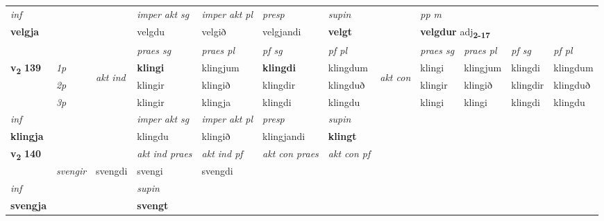 \begin{longtable}[l]{X>{\footnotesize\itshape}llXXXXlXXXX}
\cmidrule{4-7}
   {\textit{inf}} & &  & \textit{imper akt sg} & \textit{imper akt pl}   & \textit{presp} & \textit{supin}  && \textit{pp m} \\*
  {\textbf{velgja}} & && velgdu  & velgið   & velgjandi &  \textbf{velgt}  && \multicolumn{2}{l}{\textbf{velgdur} adj\textbf{\textsubscript{2-17}}} \\*

\midrule

 & &   & \textit{praes sg}  & \textit{praes pl}    & \textit{ pf sg} & \textit{pf pl} & & \textit{praes sg}  & \textit{praes pl}    & \textit{pf sg} & \textit{pf pl }  \\ \cmidrule{4-7} \cmidrule{9-12}
 \multirow{2}{*}{{{\textbf{v{\textsubscript{2}}} \Large{\textbf{139}}}}}  & 1p & \multirow{3}{*}{\begin{turn}{90}\textit{akt ind}\end{turn}} & \textbf{klingi} & klingjum & \textbf{klingdi} & klingdum & \multirow{3}{*}{\begin{turn}{90}\textit{akt con}\end{turn}} &klingi & klingjum & klingdi & klingdum\\*
 & 2p &  &  klingir  & klingið & klingdir & klingduð & & klingir & klingið & klingdir & klingduð \\*
 & 3p &  & klingir & klingja & klingdi & klingdu & & klingi & klingi& klingdi & klingdu \\*
\cmidrule{4-7} \cmidrule{9-12}

   {\textit{inf}} & &  & \textit{imper akt sg} & \textit{imper akt pl}   & \textit{presp} & \textit{supin}   \\*
  {\textbf{klingja}} & && klingdu  & klingið   & klingjandi &  \textbf{klingt}   \\*

\midrule

\multirow{2}{*}{{{\textbf{v{\textsubscript{2}}} \Large{\textbf{140}}}}}  &&&  \textit{akt ind praes} & \textit{akt ind pf} & \textit{akt con praes} & \textit{akt con pf} \\*
\multicolumn{3}{r}{\textit{e-n}} & svengir & svengdi & svengi & svengdi \\*

\cmidrule{4-7}
   {\textit{inf}} & &      & \textit{supin}   \\*
  {\textbf{svengja}} & &      &  \textbf{svengt}   \\*

\midrule


\end{longtable}

